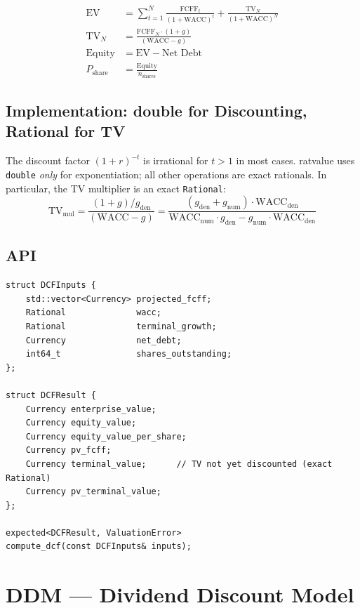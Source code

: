 \documentclass[12pt, a4paper, oneside]{book}
\newcommand{\FCFF}{\ensuremath{\mathrm{FCFF}}}
\newcommand{\WACC}{\ensuremath{\mathrm{WACC}}}
\newcommand{\EV}{\ensuremath{\mathrm{EV}}}
\newcommand{\TV}{\ensuremath{\mathrm{TV}}}
\begin{document}
\begin{align}
  \EV
  &= \sum_{t=1}^{N} \frac{\FCFF_t}{(1+\WACC)^t}
   + \frac{\TV_N}{(1+\WACC)^N}
  \label{eq:dcf_ev}
  \\[4pt]
  \TV_N
  &= \frac{\FCFF_N \cdot (1 + g)}{(\WACC - g)}
  \label{eq:gordon}
  \\[4pt]
  \text{Equity} &= \EV - \text{Net Debt}
  \\[4pt]
  P_{\text{share}} &= \frac{\text{Equity}}{n_{\text{shares}}}
\end{align}

\subsection{Implementation: double for Discounting, Rational for TV}

\begin{warning}
The discount factor $(1+r)^{-t}$ is irrational for $t > 1$ in most cases.
ratvalue uses \texttt{double} \emph{only} for exponentiation; all other
operations are exact rationals. In particular, the TV multiplier is an exact
\texttt{Rational}:
\[
  \TV_{\text{mul}} = \frac{(1+g)/g_{\text{den}}}{(\WACC - g)}
  = \frac{(g_{\text{den}} + g_{\text{num}}) \cdot \WACC_{\text{den}}}
         {\WACC_{\text{num}} \cdot g_{\text{den}} - g_{\text{num}} \cdot \WACC_{\text{den}}}
\]
\end{warning}

\subsection{API}

\begin{lstlisting}[style=cpp]
struct DCFInputs {
    std::vector<Currency> projected_fcff;
    Rational              wacc;
    Rational              terminal_growth;
    Currency              net_debt;
    int64_t               shares_outstanding;
};

struct DCFResult {
    Currency enterprise_value;
    Currency equity_value;
    Currency equity_value_per_share;
    Currency pv_fcff;
    Currency terminal_value;      // TV not yet discounted (exact Rational)
    Currency pv_terminal_value;
};

expected<DCFResult, ValuationError>
compute_dcf(const DCFInputs& inputs);
\end{lstlisting}

\section{DDM --- Dividend Discount Model}
\end{document}

